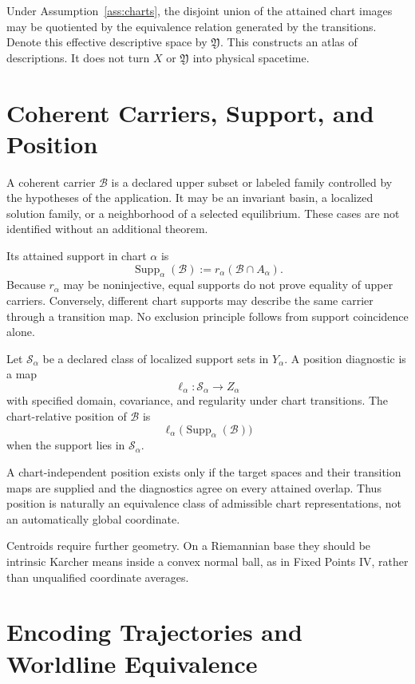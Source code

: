 \documentclass[11pt]{article}
\begin{document}
Under Assumption~\ref{ass:charts}, the disjoint union of the attained chart
images may be quotiented by the equivalence relation generated by the
transitions. Denote this effective descriptive space by $\mathfrak Y$. This
constructs an atlas of descriptions. It does not turn $X$ or $\mathfrak Y$
into physical spacetime.

\section{Coherent Carriers, Support, and Position}

A coherent carrier $\mathcal B$ is a declared upper subset or labeled family
controlled by the hypotheses of the application. It may be an invariant basin,
a localized solution family, or a neighborhood of a selected equilibrium.
These cases are not identified without an additional theorem.

Its attained support in chart $\alpha$ is
\[
 \operatorname{Supp}_\alpha(\mathcal B)
 :=r_\alpha(\mathcal B\cap A_\alpha).
\]
Because $r_\alpha$ may be noninjective, equal supports do not prove equality of
upper carriers. Conversely, different chart supports may describe the same
carrier through a transition map. No exclusion principle follows from support
coincidence alone.

\begin{definition}
Let $\mathcal S_\alpha$ be a declared class of localized support sets in
$Y_\alpha$. A position diagnostic is a map
\[
 \ell_\alpha:\mathcal S_\alpha\longrightarrow Z_\alpha
\]
with specified domain, covariance, and regularity under chart transitions.
The chart-relative position of $\mathcal B$ is
\[
 \ell_\alpha\bigl(\operatorname{Supp}_\alpha(\mathcal B)\bigr)
\]
when the support lies in $\mathcal S_\alpha$.
\end{definition}

A chart-independent position exists only if the target spaces and their
transition maps are supplied and the diagnostics agree on every attained
overlap. Thus position is naturally an equivalence class of admissible chart
representations, not an automatically global coordinate.

Centroids require further geometry. On a Riemannian base they should be
intrinsic Karcher means inside a convex normal ball, as in Fixed Points IV,
rather than unqualified coordinate averages.

\section{Encoding Trajectories and Worldline Equivalence}
\end{document}

